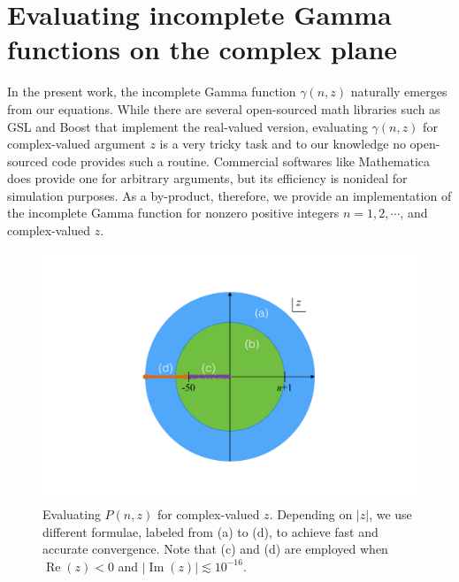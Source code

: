 \documentclass[final,1p,times]{elsarticle}
\DeclareMathOperator{\re}{Re}
\DeclareMathOperator{\im}{Im}
\begin{document}
\section{Evaluating incomplete Gamma functions on the complex plane}
\label{appen: incom_gamma}
In the present work, the incomplete Gamma function $\gamma(n,z)$ naturally emerges from our equations. While there are several open-sourced math libraries such as GSL and Boost that implement the real-valued version, evaluating $\gamma(n,z)$ for complex-valued argument $z$ is a very tricky task and to our knowledge no open-sourced code provides such a routine. Commercial softwares like Mathematica does provide one for arbitrary arguments, but its efficiency is nonideal for simulation purposes. As a by-product, therefore, we provide an implementation of the incomplete Gamma function for nonzero positive integers $n=1, 2, \cdots$, and complex-valued $z$.

\begin{figure}[htbp]%
	\centering
	\includegraphics[trim=2cm 2.2cm 2cm 2.2cm, clip=true, scale=0.7]{incomplete_Gamma_strategy}
	\caption{Evaluating $P(n,z)$ for complex-valued $z$. Depending on $|z|$, we use different formulae, labeled from (a) to (d), to achieve fast and accurate convergence. Note that (c) and (d) are employed when $\re(z)<0$ and $|\im(z)|\lesssim10^{-16}$.}
	\label{fig:incomplete Gamma}
\end{figure}
\end{document}
